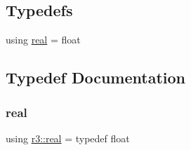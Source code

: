 \subsection*{Typedefs}
\begin{DoxyCompactItemize}
\item 
using \mbox{\hyperlink{namespacer3_ab2016b3e3f743fb735afce242f0dc1eb}{real}} = float
\end{DoxyCompactItemize}


\subsection{Typedef Documentation}
\mbox{\label{namespacer3_ab2016b3e3f743fb735afce242f0dc1eb}} 
\subsubsection{\texorpdfstring{real}{real}}
{\footnotesize\ttfamily using \mbox{\hyperlink{namespacer3_ab2016b3e3f743fb735afce242f0dc1eb}{r3\+::real}} = typedef float}

